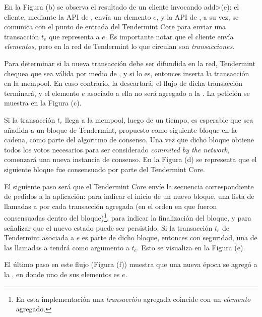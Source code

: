 En la Figura (b) se observa el resultado de un cliente invocando \<add>(e): el cliente, mediante
la API de \setchain, envía un elemento $e$, y la API de \setchain, a su vez, se comunica con el
punto de entrada del Tendermint Core para enviar una transacción $t_e$ que representa a $e$.
Es importante notar que el cliente envía \textit{elementos}, pero en la red de Tendermint
lo que circulan son \textit{transacciones}.
%

Para determinar si la nueva transacción debe ser difundida en la red, Tendermint chequea que
sea válida por medio de \CheckTx, y si lo es, entonces inserta la transacción en la mempool.
En caso contrario, la descartará, el flujo de dicha transacción terminará, y el elemento $e$
asociado a ella no será agregado a la \setchain.
La petición \CheckTx se muestra en la Figura (c).

%
Si la transacción $t_e$ llega a la mempool, luego de un tiempo, es esperable que sea añadida a un
bloque de Tendermint, propuesto como siguiente bloque en la cadena, como parte del algoritmo de
consenso.
Una vez que dicho bloque obtiene todos los votos necesarios para ser considerado
\textit{commited by the network}, comenzará una nueva instancia de consenso. En la Figura (d)
se representa que el siguiente bloque fue consensuado por parte del Tendermint Core.

%
El siguiente paso será que el Tendermint Core envíe
la secuencia correspondiente de pedidos a la aplicación: \BeginBlock para indicar el inicio de
un nuevo bloque,
una lista de llamadas a \DeliverTx por cada transacción agregada (en el orden en que fueron
consensuadas dentro del bloque)\footnote{En esta implementación
una \textit{transacción} agregada coincide con un \textit{elemento} agregado.},
\EndBlock para indicar la finalización del bloque, y \Commit para señalizar que el nuevo estado
puede ser persistido.
%
Si la transacción $t_e$ de Tendermint asociada a $e$ es parte de dicho bloque,
entonces con seguridad, una de las llamadas a \DeliverTx tendrá como argumento a $t_e$.
Esto se visualiza en la Figura (e).

%
El último paso en este flujo (Figura (f)) muestra que una nueva época se agregó a la \setchain,
en donde uno de sus elementos es $e$.

